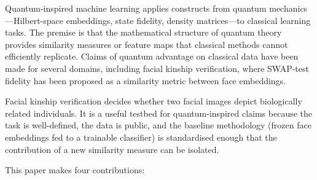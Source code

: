 \documentclass[preprint,12pt]{elsarticle}
\begin{document}
Quantum-inspired machine learning applies constructs from quantum
mechanics---Hilbert-space embeddings, state fidelity, density
matrices---to classical learning tasks. The premise is that the
mathematical structure of quantum theory provides similarity measures or
feature maps that classical methods cannot efficiently replicate. Claims of
quantum advantage on classical data have been made for several domains,
including facial kinship verification, where SWAP-test fidelity has been
proposed as a similarity metric between face embeddings.%

Facial kinship verification decides whether two facial images depict
biologically related individuals. It is a useful testbed for
quantum-inspired claims because the task is well-defined, the data is
public, and the baseline methodology (frozen face embeddings fed to a
trainable classifier) is standardised enough that the contribution of a
new similarity measure can be isolated.

This paper makes four contributions:
\end{document}
